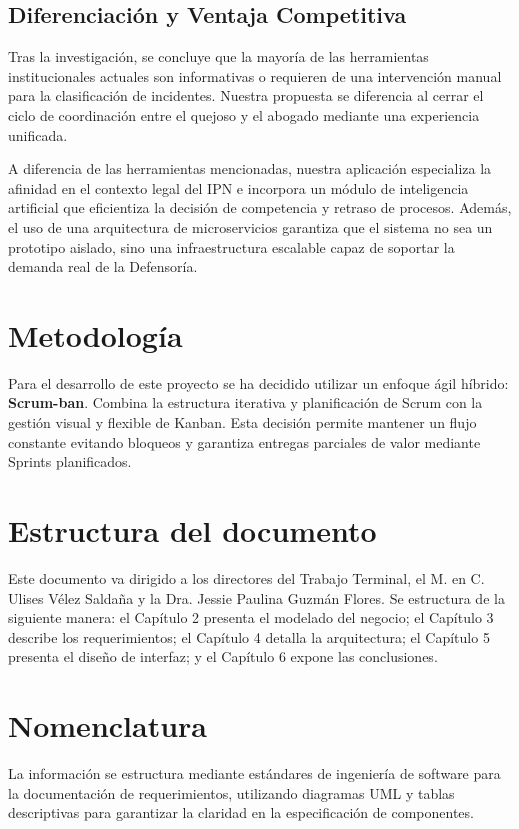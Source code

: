 \subsection{Diferenciación y Ventaja Competitiva}
Tras la investigación, se concluye que la mayoría de las herramientas institucionales actuales son informativas o requieren de una intervención manual para la clasificación de incidentes. Nuestra propuesta se diferencia al cerrar el ciclo de coordinación entre el quejoso y el abogado mediante una experiencia unificada. 

A diferencia de las herramientas mencionadas, nuestra aplicación especializa la afinidad en el contexto legal del IPN e incorpora un módulo de inteligencia artificial que eficientiza la decisión de competencia y retraso de procesos. Además, el uso de una arquitectura de microservicios garantiza que el sistema no sea un prototipo aislado, sino una infraestructura escalable capaz de soportar la demanda real de la Defensoría.

\section{Metodología}
Para el desarrollo de este proyecto se ha decidido utilizar un enfoque ágil híbrido: \textbf{Scrum-ban}. Combina la estructura iterativa y planificación de Scrum con la gestión visual y flexible de Kanban. Esta decisión permite mantener un flujo constante evitando bloqueos y garantiza entregas parciales de valor mediante Sprints planificados.

\section{Estructura del documento}
Este documento va dirigido a los directores del Trabajo Terminal, el M. en C. Ulises Vélez Saldaña y la Dra. Jessie Paulina Guzmán Flores. Se estructura de la siguiente manera: el Capítulo 2 presenta el modelado del negocio; el Capítulo 3 describe los requerimientos; el Capítulo 4 detalla la arquitectura; el Capítulo 5 presenta el diseño de interfaz; y el Capítulo 6 expone las conclusiones.

\section{Nomenclatura}
La información se estructura mediante estándares de ingeniería de software para la documentación de requerimientos, utilizando diagramas UML y tablas descriptivas para garantizar la claridad en la especificación de componentes.